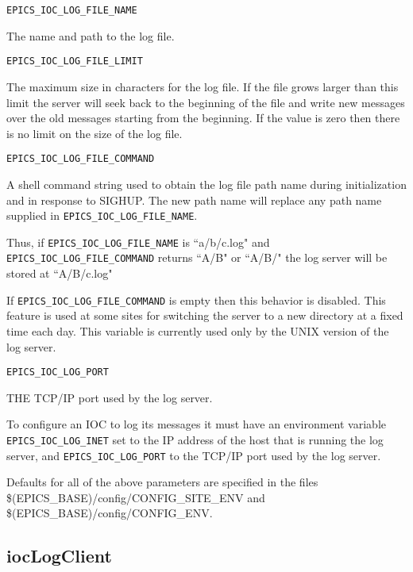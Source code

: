 \begin{description}

\item {}\verb|EPICS_IOC_LOG_FILE_NAME|

The name and path to the log file.

\item {}\verb|EPICS_IOC_LOG_FILE_LIMIT|

The maximum size in characters for the log file.
If the file grows larger than this limit the server will seek back to the beginning of the file and write new messages over the old messages starting from the beginning.
If the value is zero then there is no limit on the size of the log file.

\item {}\verb|EPICS_IOC_LOG_FILE_COMMAND|

A shell command string used to obtain the log file path name during initialization and in response to SIGHUP.
The new path name will replace any path name supplied in \verb|EPICS_IOC_LOG_FILE_NAME|.

Thus, if \verb|EPICS_IOC_LOG_FILE_NAME| is ``a/b/c.log" and \verb|EPICS_IOC_LOG_FILE_COMMAND| returns ``A/B" or ``A/B/" the log server will be stored at ``A/B/c.log"

If \verb|EPICS_IOC_LOG_FILE_COMMAND| is empty then this behavior is disabled.
This feature is used at some sites for switching the server to a new directory at a fixed time each day.
This variable is currently used only by the UNIX version of the log server.

\item {}\verb|EPICS_IOC_LOG_PORT|

THE TCP/IP port used by the log server.

\end{description}

To configure an IOC to log its messages it must have an environment variable \verb|EPICS_IOC_LOG_INET| set to the IP address of the host that is running the log server, and \verb|EPICS_IOC_LOG_PORT| to the TCP/IP port used by the log server.

Defaults for all of the above parameters are specified in  the files \$(EPICS\_BASE)/config/CONFIG\_SITE\_ENV and \$(EPICS\_BASE)/config/CONFIG\_ENV.

\subsection{iocLogClient}
\label{iocLogClient}

